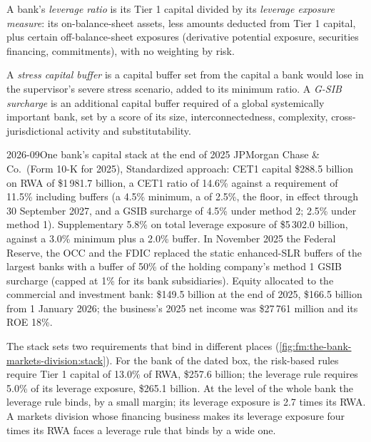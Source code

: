 \begin{definition}\label{def:fm:the-bank-markets-division:lr}
A bank's \emph{leverage ratio} is its Tier 1 capital divided by its \emph{leverage exposure measure}: its on-balance-sheet assets, less amounts deducted from Tier 1 capital, plus certain off-balance-sheet exposures (derivative
potential exposure, securities financing, commitments), with no weighting by risk.
\end{definition}

\begin{definition}\label{def:fm:the-bank-markets-division:buffers}
A \emph{stress capital buffer} is a capital buffer set from the capital a bank would lose in the supervisor's severe
stress scenario, added to its minimum ratio. A \emph{G-SIB surcharge} is an additional capital buffer required of a
global systemically important bank, set by a score of its size, interconnectedness, complexity, cross-jurisdictional activity and
substitutability.
\end{definition}

\begin{dated}{2026-09}{One bank's capital stack at the end of 2025}\label{dat:fm:the-bank-markets-division:jpm}
JPMorgan Chase \& Co.\ (Form 10-K for 2025), Standardized approach: CET1 capital \$288.5 billion on RWA of \$1\,981.7 billion, a CET1 ratio of
14.6\% against a requirement of 11.5\% including buffers (a 4.5\% minimum, a  of 2.5\%, the floor, in effect through
30 September 2027, and a GSIB surcharge of 4.5\% under method 2; 2.5\% under method 1). Supplementary  5.8\% on total leverage
exposure of \$5\,302.0 billion, against a 3.0\% minimum plus a 2.0\% buffer. In November 2025 the Federal Reserve, the OCC and the FDIC replaced the
static enhanced-SLR buffers of the largest banks with a buffer of 50\% of the holding company's method 1 GSIB surcharge (capped at 1\% for its bank
subsidiaries). Equity allocated to the commercial and investment bank: \$149.5 billion at the end of 2025, \$166.5 billion from 1 January 2026;
the business's 2025 net income was \$27\,761 million and its ROE 18\%.
\end{dated}

The stack sets two requirements that bind in different places (\cref{fig:fm:the-bank-markets-division:stack}). For the bank of the dated box,
the risk-based rules require Tier 1 capital of 13.0\% of RWA, \$257.6 billion; the leverage rule requires 5.0\% of its leverage exposure, \$265.1
billion. At the level of the whole bank the leverage rule binds, by a small margin; its leverage exposure is 2.7 times its RWA. A markets division
whose financing business makes its leverage exposure four times its RWA faces a leverage rule that binds by a wide one.

